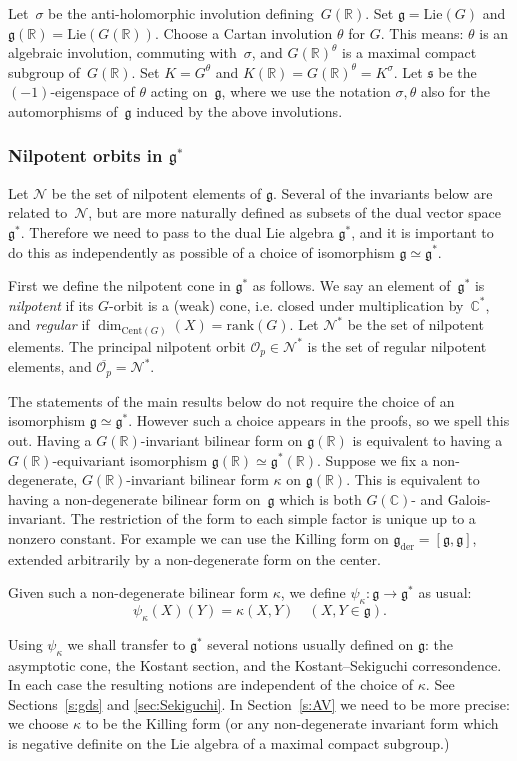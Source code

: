 \documentclass[10pt,leqno]{article}
\numberwithin{equation}{section}
\newcommand{\Cent}{\mathrm{Cent}}
\renewcommand{\O}{\mathcal O}
\newcommand{\R}{\mathbb R}
\newcommand{\C}{\mathbb C}
\newcommand{\N}{\mathcal N}
\newcommand{\Lie}{\mathrm{Lie}}
\newcommand{\g}{\mathfrak g}
\newcommand{\gder}{\mathfrak g_{\mathrm{der}}}
\newcommand{\s}{\mathfrak s}
\begin{document}
Let~$\sigma$ be the anti-holomorphic involution defining~$G(\R)$.
Set $\g=\Lie(G)$ and $\g(\R)=\Lie(G(\R))$. 
Choose a Cartan involution $\theta$ for $G$. This means:
$\theta$ is an algebraic involution, commuting with~$\sigma$,
and $G(\R)^\theta$ is a maximal compact subgroup of~$G(\R)$. Set $K=G^\theta$ and $K(\R)=G(\R)^\theta=K^\sigma$.
Let $\s$ be the $(-1)$-eigenspace of $\theta$ acting on~$\g$, where we use the notation $\sigma, \theta$ also for the automorphisms of~$\g$ induced by the above involutions.

\subsubsection*{Nilpotent orbits in $\g^*$} 
\label{s:dual}
Let $\N$ be the set of nilpotent elements of $\g$. Several of the invariants below are related to~$\N$, but are more naturally defined as subsets of the dual vector space~$\g^\ast$.
Therefore we need to pass to the dual Lie algebra $\g^*$, and it is important to do this as independently as possible of a choice
of isomorphism $\g\simeq\g^*$. 

First we define the nilpotent cone in $\g^*$ as follows. 
We say an element of~$\g^*$ is \emph{nilpotent} if its $G$-orbit is a (weak) cone, i.e. closed under multiplication by~$\C^*$,
and \emph{regular} if $\dim_{\Cent(G)}(X)=\mathrm{rank}(G)$.
Let $\N^*$ be the set of nilpotent elements.
The principal nilpotent orbit $\O_p\in \N^*$ is the set of regular nilpotent elements, and $\overline{\O_p}=\N^*$.

The statements of the main results below do not require the choice of an isomorphism $\g\simeq \g^*$. However such a choice appears in the proofs, so we spell this out.
Having a $G(\R)$-invariant bilinear form on $\g(\R)$ is equivalent to having a $G(\R)$-equivariant isomorphism $\g(\R)\simeq \g^*(\R)$. 
Suppose we fix a non-degenerate, $G(\R)$-invariant bilinear form $\kappa$ on $\g(\R)$. This is equivalent to having a non-degenerate bilinear form on~$\g$ which is both $G(\C)$- and Galois-invariant. The restriction of the form to each simple factor
is unique up to a nonzero constant. For example we can use the Killing form on $\gder=[\g, \g]$, extended arbitrarily by a non-degenerate form on the center.

Given such a non-degenerate bilinear form $\kappa$, we define
$\psi_\kappa: \g\rightarrow \g^*$ as usual:
$$
\psi_\kappa(X)(Y)=\kappa(X,Y)\quad (X,Y\in\g).
$$

Using $\psi_\kappa$ we shall transfer to $\g^\ast$ several notions usually defined on $\g$: the asymptotic cone, the Kostant section, and the Kostant--Sekiguchi corresondence. In each case the resulting notions are independent of the
choice of $\kappa$. See Sections~\ref{s:gds} and \ref{sec:Sekiguchi}.
In Section~\ref{s:AV} we need to be more precise: we choose  $\kappa$ to be the Killing form  (or any non-degenerate
invariant form which is negative definite on the Lie algebra of a maximal compact subgroup.)
\end{document}
